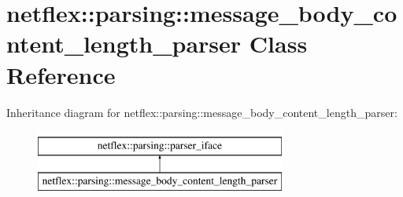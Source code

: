 \hypertarget{classnetflex_1_1parsing_1_1message__body__content__length__parser}{}\section{netflex\+:\+:parsing\+:\+:message\+\_\+body\+\_\+content\+\_\+length\+\_\+parser Class Reference}
\label{classnetflex_1_1parsing_1_1message__body__content__length__parser}
Inheritance diagram for netflex\+:\+:parsing\+:\+:message\+\_\+body\+\_\+content\+\_\+length\+\_\+parser\+:\begin{figure}[H]
\begin{center}
\leavevmode
\includegraphics[height=2.000000cm]{classnetflex_1_1parsing_1_1message__body__content__length__parser}
\end{center}
\end{figure}
